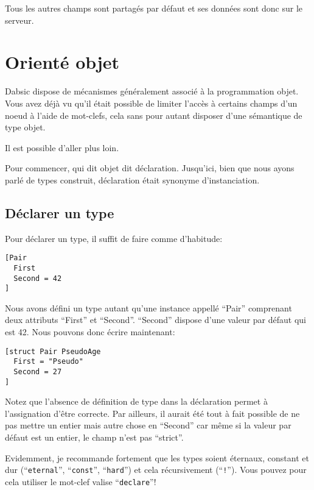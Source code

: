 \documentclass[a5paper, 12pt]{book}
\begin{document}
Tous les autres champs sont partagés par défaut et ses
données sont donc sur le serveur.


\chapter{Orienté objet}

Dabsic dispose de mécanismes généralement associé à la
programmation objet. Vous avez déjà vu qu'il était possible
de limiter l'accès à certains champs d'un noeud à l'aide
de mot-clefs, cela sans pour autant disposer d'une sémantique
de type objet.

Il est possible d'aller plus loin.

Pour commencer, qui dit objet dit déclaration. Jusqu'ici,
bien que nous ayons parlé de types construit, déclaration
était synonyme d'instanciation.

\section{Déclarer un type}

Pour déclarer un type, il suffit de faire comme d'habitude:

\begin{verbatim}
[Pair
  First
  Second = 42
]
\end{verbatim}

Nous avons défini un type autant qu'une instance appellé
``Pair'' comprenant deux attributs ``First'' et ``Second''.
``Second'' dispose d'une valeur par défaut qui est 42.
Nous pouvons donc écrire maintenant:\\

\begin{verbatim}
[struct Pair PseudoAge
  First = "Pseudo"
  Second = 27
]
\end{verbatim}

Notez que l'absence de définition de type dans la déclaration
permet à l'assignation d'être correcte. Par ailleurs, il aurait
été tout à fait possible de ne pas mettre un entier mais autre
chose en ``Second'' car même si la valeur par défaut est un entier,
le champ n'est pas ``strict''.

Evidemment, je recommande fortement que les types soient
éternaux, constant et dur (``\verb!eternal!'', ``\verb!const!'', ``\verb!hard!'')
et cela récursivement (``\verb|!|'').
Vous pouvez pour cela utiliser le mot-clef valise ``\verb!declare!''!
\end{document}
